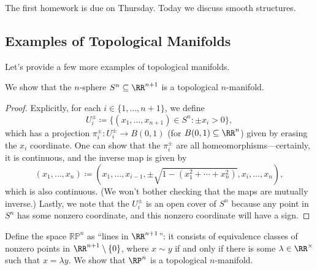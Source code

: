 \documentclass[../notes.tex]{subfiles}
\begin{document}
The first homework is due on Thursday. Today we discuss smooth structures.

\subsection{Examples of Topological Manifolds}
Let's provide a few more examples of topological manifolds.
\begin{exe}[sphere] \label{exe:sphere-top-man}
	We show that the $n$-sphere $S^n\subseteq\RR^{n+1}$ is a topological $n$-manifold.
\end{exe}
\begin{proof}
	Explicitly, for each $i\in\{1,\ldots,n+1\}$, we define
	\[U_i^\pm\coloneqq\{(x_1,\ldots,x_{n+1})\in S^n:\pm x_i>0\},\]
	which has a projection $\pi_i^\pm\colon U_i^\pm\to B(0,1)$ (for $B(0,1)\subseteq\RR^n$) given by erasing the $x_i$ coordinate. One can show that the $\pi_i^\pm$ are all homeomorphisms---certainly, it is continuous, and the inverse map is given by
	\[(x_1,\ldots,x_n)\coloneqq\left(x_1,\ldots,x_{i-1},\pm\sqrt{1-\left(x_1^2+\cdots+x_n^2\right)},x_i,\ldots,x_n\right),\]
	which is also continuous. (We won't bother checking that the maps are mutually inverse.) Lastly, we note that the $U_i^\pm$ is an open cover of $S^n$ because any point in $S^n$ has some nonzero coordinate, and this nonzero coordinate will have a sign.
\end{proof}
\begin{exe} \label{exe:rpn-top-man}
	Define the space $\mathbb{RP}^n$ as ``lines in $\RR^{n+1}$'': it consists of equivalence classes of nonzero points in $\RR^{n+1}\setminus\{0\}$, where $x\sim y$ if and only if there is some $\lambda\in\RR^\times$ such that $x=\lambda y$. We show that $\RP^n$ is a topological $n$-manifold.
\end{exe}
\end{document}
